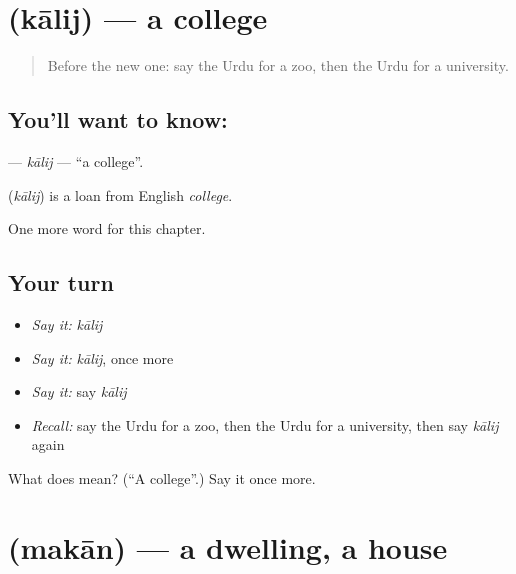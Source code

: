 \section[\texorpdfstring{\ur{کالج} (kālij)}{کالج (kālij)}]{ (kālij) — a college}

\label{lesson:UR-C190-kalij}



\begin{quote}
Before the new one: say the Urdu for a zoo, then the Urdu for a university.
\end{quote}

\subsection*{You'll want to know: }
\textbf{} — \emph{kālij} — \textquotedblleft{}a college\textquotedblright{}.

\begin{cousinweb}
\textbf{} (\emph{kālij}) is a loan from English \emph{college}.
\end{cousinweb}

\begin{grammarlens}[title={What you've built}]
One more word for this chapter.
\end{grammarlens}

\subsection*{Your turn}
\begin{itemize}
\raggedright
  \item \emph{Say it:} \emph{kālij}
  \item \emph{Say it:} \emph{kālij}, once more
  \item \emph{Say it:} say \emph{kālij}
  \item \emph{Recall:} say the Urdu for a zoo, then the Urdu for a university, then say \emph{kālij} again
\end{itemize}

\begin{tcolorbox}[breakable,colback=teal!4,colframe=teal!35!black,title={Before you move on}]
What does  mean? (\textquotedblleft{}A college\textquotedblright{}.) Say it once more.
\end{tcolorbox}
\section[\texorpdfstring{\ur{مکان} (makān)}{مکان (makān)}]{ (makān) — a dwelling, a house}

